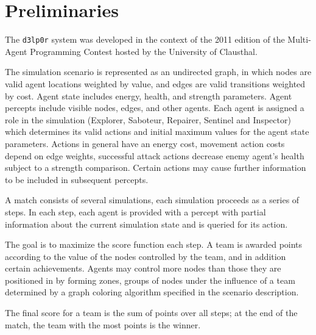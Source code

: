 \documentclass{llncs2e/llncs}
\begin{document}

\section{Preliminaries}

    The \texttt{d3lp0r} system was developed in the context of the 2011 edition 
    of the Multi-Agent Programming Contest hosted by the University of 
    Clausthal. 

    The simulation scenario is represented as an undirected graph, in which 
    nodes are valid agent locations weighted by value, and edges are valid
    transitions weighted by cost. 
    Agent state includes energy, health, and strength parameters. Agent percepts
    include visible nodes, edges, and other agents. 
    Each agent is assigned a role in the simulation (Explorer, Saboteur,
    Repairer, Sentinel and Inspector) which determines its valid actions and
    initial maximum values for the agent state parameters. 
    Actions in general have an energy cost, movement action costs depend on edge
    weights, successful attack actions decrease enemy agent's health subject to
    a strength comparison. Certain actions may cause further information to be
    included in subsequent percepts. 

    A match consists of several simulations, each simulation proceeds as
    a series of steps. In each step, each agent is provided with a percept with
    partial information about the current simulation state and is
    queried for its action. 

    The goal is to maximize the score function each step. A team is awarded
    points according to the value of the nodes controlled by the team, and
    in addition certain achievements. Agents may control more nodes than 
    those they are positioned in by forming zones, groups of nodes under the
    influence of a team determined by a graph coloring algorithm specified in
    the scenario description. 

    The final score for a team is the sum of points over all steps; at the end
    of the match, the team with the most points is the winner.
\end{document}
